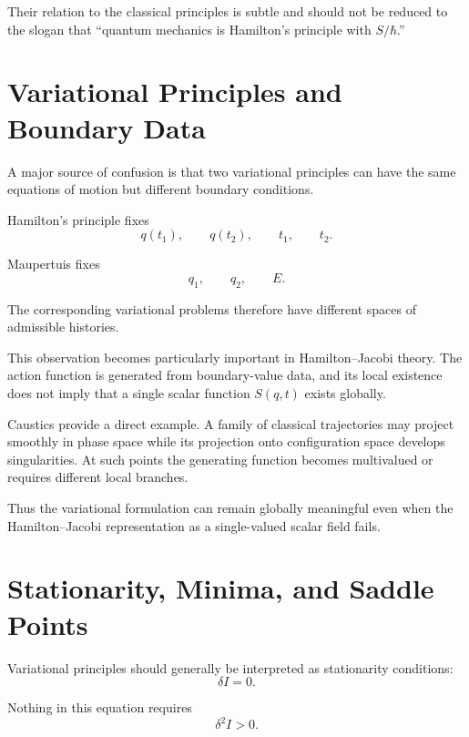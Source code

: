 Their relation to the classical principles is subtle and should not be reduced to the slogan that ``quantum mechanics is Hamilton's principle with $S/\hbar$.''

\section{Variational Principles and Boundary Data}

A major source of confusion is that two variational principles can have the same equations of motion but different boundary conditions.

Hamilton's principle fixes
\begin{equation}
q(t_1),\qquad q(t_2),\qquad t_1,\qquad t_2.
\end{equation}

Maupertuis fixes
\begin{equation}
q_1,\qquad q_2,\qquad E.
\end{equation}

The corresponding variational problems therefore have different spaces of admissible histories.

This observation becomes particularly important in Hamilton--Jacobi theory.  The action function is generated from boundary-value data, and its local existence does not imply that a single scalar function $S(q,t)$ exists globally.

Caustics provide a direct example.  A family of classical trajectories may project smoothly in phase space while its projection onto configuration space develops singularities.  At such points the generating function becomes multivalued or requires different local branches.

Thus the variational formulation can remain globally meaningful even when the Hamilton--Jacobi representation as a single-valued scalar field fails.

\section{Stationarity, Minima, and Saddle Points}

Variational principles should generally be interpreted as stationarity conditions:
\begin{equation}
\delta I=0.
\end{equation}

Nothing in this equation requires
\begin{equation}
\delta^2 I>0.
\end{equation}

